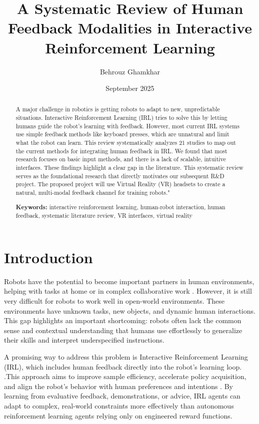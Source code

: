 \documentclass[rnd]{mas_proposal}
\title{A Systematic Review of Human Feedback Modalities in Interactive Reinforcement Learning}
\author{Behrouz Ghamkhar}
\date{September 2025}
\begin{document}
\maketitle

\pagestyle{plain}


\begin{abstract}
    A major challenge in robotics is getting robots to adapt to new, unpredictable situations. Interactive Reinforcement Learning (IRL) tries to solve this by letting humans guide the robot's learning with feedback. However, most current IRL systems use simple feedback methods like keyboard presses, which are unnatural and limit what the robot can learn. This review systematically analyzes 21 studies to map out the current methods for integrating human feedback in IRL. We found that most research focuses on basic input methods, and there is a lack of scalable, intuitive interfaces. These findings highlight a clear gap in the literature. This systematic review serves as the foundational research that directly motivates our subsequent R\&D project. The proposed project will use Virtual Reality (VR) headsets to create a natural, multi-modal feedback channel for training robots."

    \textbf{Keywords:} interactive reinforcement learning, human-robot interaction, human feedback, systematic literature review, VR interfaces, virtual reality
\end{abstract}

\section{Introduction}
Robots have the potential to become important partners in human environments, helping with tasks at home or in complex collaborative work \citep{Chetouani2021, Akalin2021}. However, it is still very difficult for robots to work well in open-world environments. These environments have unknown tasks, new objects, and dynamic human interactions. This gap highlights an important shortcoming: robots often lack the common sense and contextual understanding that humans use effortlessly to generalize their skills and interpret underspecified instructions.

A promising way to address this problem is Interactive Reinforcement Learning (IRL), which includes human feedback directly into the robot's learning loop. \citep{Lin2020, BradleyKnox2008}.This approach aims to improve sample efficiency, accelerate policy acquisition, and align the robot's behavior with human preferences and intentions \citep{Lin2020}. By learning from evaluative feedback, demonstrations, or advice, IRL agents can adapt to complex, real-world constraints more effectively than autonomous reinforcement learning agents relying only on engineered reward functions.
\end{document}
